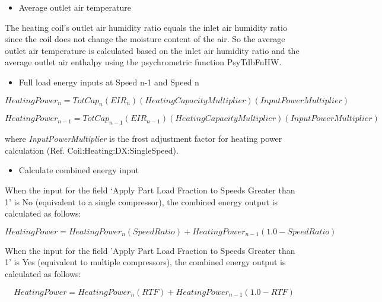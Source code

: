 \begin{itemize}
  \item Average outlet air temperature
\end{itemize}

The heating coil's outlet air humidity ratio equals the inlet air humidity ratio since the coil does not change the moisture content of the air. So the average outlet air temperature is calculated based on the inlet air humidity ratio and the average outlet air enthalpy using the psychrometric function PsyTdbFnHW.

\begin{itemize}
  \item Full load energy inputs at Speed n-1 and Speed n
\end{itemize}

\begin{equation}
HeatingPowe{r_n} = TotCa{p_n}\left( {EI{R_n}} \right)\left( {HeatingCapacityMultiplier} \right)\left( {InputPowerMultiplier} \right)
\end{equation}

\begin{equation}
HeatingPowe{r_{n - 1}} = TotCa{p_{n - 1}}\left( {EI{R_{n - 1}}} \right)\left( {HeatingCapacityMultiplier} \right)\left( {InputPowerMultiplier} \right)
\end{equation}

where \emph{InputPowerMultiplier} is the frost adjustment factor for heating power calculation (Ref. Coil:Heating:DX:SingleSpeed).

\begin{itemize}
  \item Calculate combined energy input
\end{itemize}

When the input for the field `Apply Part Load Fraction to Speeds Greater than 1' is No (equivalent to a single compressor), the combined energy output is calculated as follows:

\begin{equation}
HeatingPower = HeatingPowe{r_n}\left( {SpeedRatio} \right) + HeatingPowe{r_{n - 1}}(1.0 - SpeedRatio)
\end{equation}

When the input for the field 'Apply Part Load Fraction to Speeds Greater than 1' is Yes (equivalent to multiple compressors), the combined energy output is calculated as follows:

\begin{equation}
HeatingPower = HeatingPowe{r_n}\left( {RTF} \right) + HeatingPowe{r_{n - 1}}(1.0 - RTF)
\end{equation}

